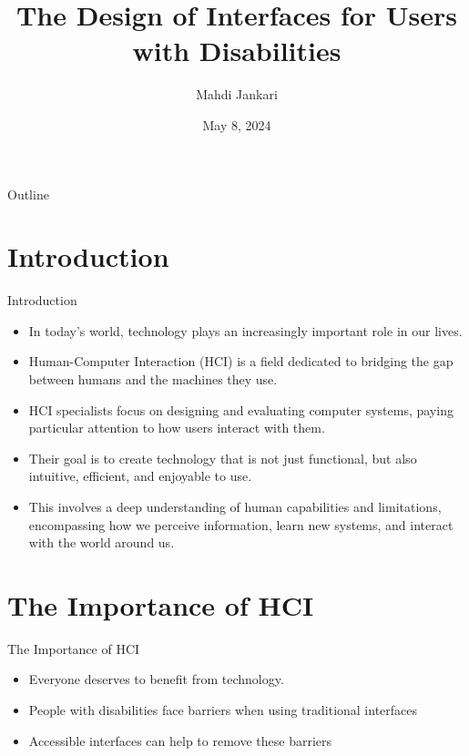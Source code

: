 \documentclass{beamer}
\title{The Design of Interfaces for Users with Disabilities}
\author{Mahdi Jankari}
\date{May 8, 2024}
\begin{document}
\maketitle

\begin{frame}{Outline}
\tableofcontents
\end{frame}

\section{Introduction}
\begin{frame}{Introduction}
    \begin{itemize}
        \item In today's world, technology plays an increasingly important role in our lives.
        \item Human-Computer Interaction (HCI) is a field dedicated to bridging the gap between humans and the machines they use.
        \item HCI specialists focus on designing and evaluating computer systems, paying particular attention to how users interact with them.
        \item Their goal is to create technology that is not just functional, but also intuitive, efficient, and enjoyable to use.
        \item This involves a deep understanding of human capabilities and limitations, encompassing how we perceive information, learn new systems, and interact with the world around us.
    \end{itemize}
\end{frame}

\section{The Importance of HCI}
\begin{frame}{The Importance of HCI}
    \begin{itemize}
        \item Everyone deserves to benefit from technology.
        \item People with disabilities face barriers when using traditional interfaces
        \item Accessible interfaces can help to remove these barriers
    \end{itemize}
\end{frame}
\end{document}
